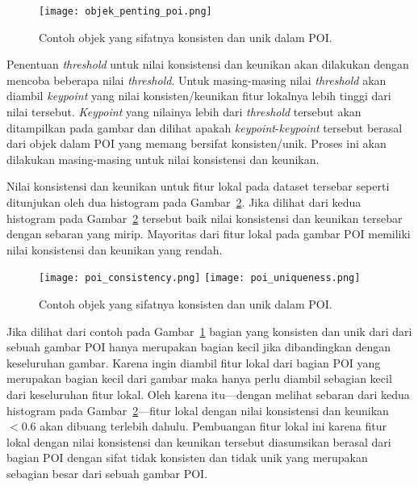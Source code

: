\begin{figure}[H]
	\centering
	\texttt{[image: objek\_penting\_poi.png]}
	\caption{Contoh objek yang sifatnya konsisten dan unik dalam POI.}
	\label{fig:objek_penting_poi}
\end{figure}

Penentuan \textit{threshold} untuk nilai konsistensi dan keunikan akan dilakukan dengan mencoba beberapa nilai \textit{threshold}. Untuk masing-masing nilai \textit{threshold} akan diambil \textit{keypoint} yang nilai konsisten/keunikan fitur lokalnya lebih tinggi dari nilai tersebut. \textit{Keypoint} yang nilainya lebih dari \textit{threshold} tersebut akan ditampilkan pada gambar dan dilihat apakah \textit{keypoint}-\textit{keypoint} tersebut berasal dari objek dalam POI yang memang bersifat konsisten/unik. Proses ini akan dilakukan masing-masing untuk nilai konsistensi dan keunikan.

Nilai konsistensi dan keunikan untuk fitur lokal pada dataset tersebar seperti ditunjukan oleh dua histogram pada Gambar~\ref{fig:poi_consistency_uniqueness}. Jika dilihat dari kedua histogram pada Gambar~\ref{fig:poi_consistency_uniqueness} tersebut baik nilai konsistensi dan keunikan tersebar dengan sebaran yang mirip. Mayoritas dari fitur lokal pada gambar POI memiliki nilai konsistensi dan keunikan yang rendah. 
\begin{figure}[H]
	\centering
	\texttt{[image: poi\_consistency.png]}
	\texttt{[image: poi\_uniqueness.png]}
	\caption{Contoh objek yang sifatnya konsisten dan unik dalam POI.}
	\label{fig:poi_consistency_uniqueness}
\end{figure}
Jika dilihat dari contoh pada Gambar~\ref{fig:objek_penting_poi} bagian yang konsisten dan unik dari dari sebuah gambar POI hanya merupakan bagian kecil jika dibandingkan dengan keseluruhan gambar. Karena ingin diambil fitur lokal dari bagian POI yang merupakan bagian kecil dari gambar maka hanya perlu diambil sebagian kecil dari keseluruhan fitur lokal. Oleh karena itu---dengan melihat sebaran dari kedua histogram pada Gambar~\ref{fig:poi_consistency_uniqueness}---fitur lokal dengan nilai konsistensi dan keunikan $<0.6$ akan dibuang terlebih dahulu. Pembuangan fitur lokal ini karena fitur lokal dengan nilai konsistensi dan keunikan tersebut diasumsikan berasal dari bagian POI dengan sifat tidak konsisten dan tidak unik yang merupakan sebagian besar dari sebuah gambar POI. 

